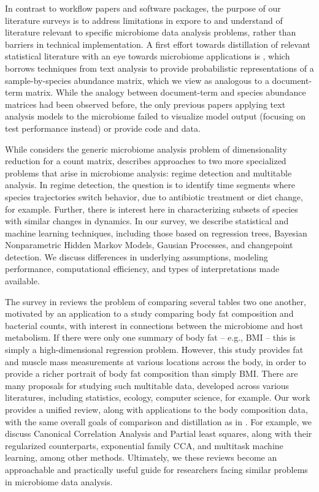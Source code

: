 \documentclass{article}
\begin{document}
In contrast to workflow papers and software packages, the purpose of our
literature surveys is to address limitations in expore to and understand of
literature relevant to specific microbiome data analysis problems, rather than
barriers in technical implementation. A first effort towards distillation of
relevant statistical literature with an eye towards microbiome applications is
\citep{sankaran2017latent}, which borrows techniques from text analysis to
provide probabilistic representations of a sample-by-species abundance matrix,
which we view as analogous to a document-term matrix. While the analogy between
document-term and species abundance matrices had been observed before, the only
previous papers applying text analysis models to the microbiome failed to
visualize model output (focusing on test performance instead) or provide code
and data.

While \citep{sankaran2017latent} considers the generic microbiome analysis
problem of dimensionality reduction for a count matrix,
\citep{sankaran2017inference, sankaran2017survey} describes approaches to two
more specialized problems that arise in microbiome analysis: regime detection
and multitable analysis. In regime detection, the question is to identify time
segments where species trajectories switch behavior, due to antibiotic treatment
or diet change, for example. Further, there is interest here in characterizing
subsets of species with similar changes in dynamics. In our survey, we describe
statistical and machine learning techniques, including those based on regression
trees, Bayesian Nonparametric Hidden Markov Models, Gausian Processes, and
changepoint detection. We discuss differences in underlying assumptions,
modeling performance, computational efficiency, and types of interpretations
made available.

The survey in \citep{sankaran2017survey} reviews the problem of comparing
several tables two one another, motivated by an application to a study comparing
body fat composition and bacterial counts, with interest in connections between
the microbiome and host metabolism. If there were only one summary of body fat
-- e.g., BMI -- this is simply a high-dimensional regression problem. However,
this study provides fat and muscle mass measurements at various locations across
the body, in order to provide a richer portrait of body fat composition than
simply BMI. There are many proposals for studying such multitable data,
developed across various literatures, including statistics, ecology, computer
science, for example. Our work provides a unified review, along with
applications to the body composition data, with the same overall goals of
comparison and distillation as in \citep{sankaran2017inference}. For example, we
discuss Canonical Correlation Analysis and Partial least squares, along with
their regularized counterparts, exponential family CCA, and multitask machine
learning, among other methods. Ultimately, we these reviews become an
approachable and practically useful guide for researchers facing similar
problems in microbiome data analysis.
\end{document}
